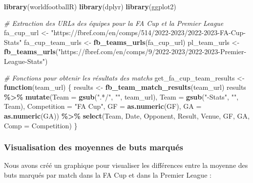 \documentclass[
]{article}
\newenvironment{Shaded}{\begin{snugshade}}{\end{snugshade}}
\newcommand{\AttributeTok}[1]{\textcolor[rgb]{0.13,0.29,0.53}{#1}}
\newcommand{\CommentTok}[1]{\textcolor[rgb]{0.56,0.35,0.01}{\textit{#1}}}
\newcommand{\ControlFlowTok}[1]{\textcolor[rgb]{0.13,0.29,0.53}{\textbf{#1}}}
\newcommand{\FunctionTok}[1]{\textcolor[rgb]{0.13,0.29,0.53}{\textbf{#1}}}
\newcommand{\NormalTok}[1]{#1}
\newcommand{\OtherTok}[1]{\textcolor[rgb]{0.56,0.35,0.01}{#1}}
\newcommand{\SpecialCharTok}[1]{\textcolor[rgb]{0.81,0.36,0.00}{\textbf{#1}}}
\newcommand{\StringTok}[1]{\textcolor[rgb]{0.31,0.60,0.02}{#1}}
\begin{document}
\begin{Shaded}
\begin{Highlighting}[]
\FunctionTok{library}\NormalTok{(worldfootballR)}
\FunctionTok{library}\NormalTok{(dplyr)}
\FunctionTok{library}\NormalTok{(ggplot2)}

\CommentTok{\# Extraction des URLs des équipes pour la FA Cup et la Premier League}
\NormalTok{fa\_cup\_url }\OtherTok{\textless{}{-}} \StringTok{"https://fbref.com/en/comps/514/2022{-}2023/2022{-}2023{-}FA{-}Cup{-}Stats"}
\NormalTok{fa\_cup\_team\_urls }\OtherTok{\textless{}{-}} \FunctionTok{fb\_teams\_urls}\NormalTok{(fa\_cup\_url)}
\NormalTok{pl\_team\_urls }\OtherTok{\textless{}{-}} \FunctionTok{fb\_teams\_urls}\NormalTok{(}\StringTok{"https://fbref.com/en/comps/9/2022{-}2023/2022{-}2023{-}Premier{-}League{-}Stats"}\NormalTok{)}

\CommentTok{\# Fonctions pour obtenir les résultats des matchs}
\NormalTok{get\_fa\_cup\_team\_results }\OtherTok{\textless{}{-}} \ControlFlowTok{function}\NormalTok{(team\_url) \{}
\NormalTok{  results }\OtherTok{\textless{}{-}} \FunctionTok{fb\_team\_match\_results}\NormalTok{(team\_url)}
\NormalTok{  results }\SpecialCharTok{\%\textgreater{}\%} \FunctionTok{mutate}\NormalTok{(}\AttributeTok{Team =} \FunctionTok{gsub}\NormalTok{(}\StringTok{".*/"}\NormalTok{, }\StringTok{""}\NormalTok{, team\_url), }\AttributeTok{Team =} \FunctionTok{gsub}\NormalTok{(}\StringTok{"{-}Stats"}\NormalTok{, }\StringTok{""}\NormalTok{, Team),}
                    \AttributeTok{Competition =} \StringTok{"FA Cup"}\NormalTok{, }\AttributeTok{GF =} \FunctionTok{as.numeric}\NormalTok{(GF), }\AttributeTok{GA =} \FunctionTok{as.numeric}\NormalTok{(GA)) }\SpecialCharTok{\%\textgreater{}\%}
    \FunctionTok{select}\NormalTok{(Team, Date, Opponent, Result, Venue, GF, GA, }\AttributeTok{Comp =}\NormalTok{ Competition)}
\NormalTok{\}}
\end{Highlighting}
\end{Shaded}

\subsubsection{Visualisation des moyennes de buts
marqués}\label{visualisation-des-moyennes-de-buts-marquuxe9s}

Nous avons créé un graphique pour visualiser les différences entre la
moyenne des buts marqués par match dans la FA Cup et dans la Premier
League :
\end{document}
